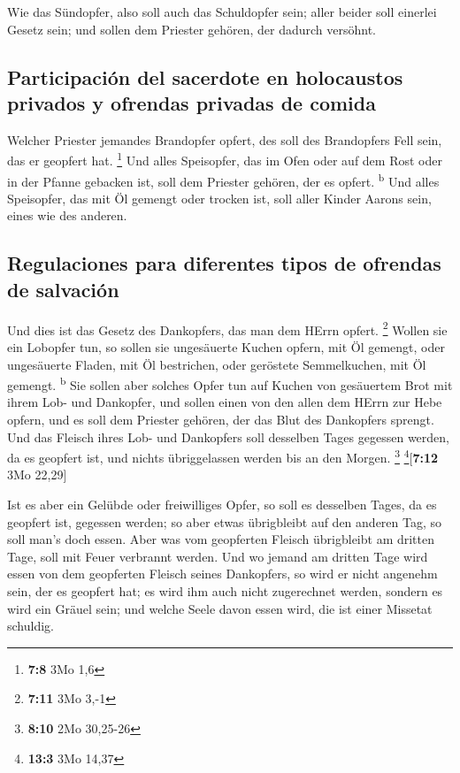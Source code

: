  Wie das Sündopfer, also soll auch das Schuldopfer sein;
aller beider soll einerlei Gesetz sein; und sollen dem Priester gehören,
der dadurch versöhnt.

\hypertarget{participaciuxf3n-del-sacerdote-en-holocaustos-privados-y-ofrendas-privadas-de-comida}{%
\subsection{Participación del sacerdote en holocaustos privados y
ofrendas privadas de
comida}\label{participaciuxf3n-del-sacerdote-en-holocaustos-privados-y-ofrendas-privadas-de-comida}}

 Welcher Priester jemandes Brandopfer opfert, des soll des
Brandopfers Fell sein, das er geopfert hat. \footnote{\textbf{7:8} 3Mo
  1,6}  Und alles Speisopfer, das im Ofen oder auf dem
Rost oder in der Pfanne gebacken ist, soll dem Priester gehören, der es
opfert. \textsuperscript{b}  Und alles Speisopfer, das
mit Öl gemengt oder trocken ist, soll aller Kinder Aarons sein, eines
wie des anderen.

\hypertarget{regulaciones-para-diferentes-tipos-de-ofrendas-de-salvaciuxf3n}{%
\subsection{Regulaciones para diferentes tipos de ofrendas de
salvación}\label{regulaciones-para-diferentes-tipos-de-ofrendas-de-salvaciuxf3n}}

 Und dies ist das Gesetz des Dankopfers, das man dem
HErrn opfert. \footnote{\textbf{7:11} 3Mo 3,-1}  Wollen
sie ein Lobopfer tun, so sollen sie ungesäuerte Kuchen opfern, mit Öl
gemengt, oder ungesäuerte Fladen, mit Öl bestrichen, oder geröstete
Semmelkuchen, mit Öl gemengt. \textsuperscript{b}  Sie
sollen aber solches Opfer tun auf Kuchen von gesäuertem Brot mit ihrem
Lob- und Dankopfer,  und sollen einen von den allen dem
HErrn zur Hebe opfern, und es soll dem Priester gehören, der das Blut
des Dankopfers sprengt.  Und das Fleisch ihres Lob- und
Dankopfers soll desselben Tages gegessen werden, da es geopfert ist, und
nichts übriggelassen werden bis an den Morgen. \footnote{\textbf{8:10}
  2Mo 30,25-26} \footnote{\textbf{13:3} 3Mo 14,37}{[}\textbf{7:12} 3Mo
22,29{]}

 Ist es aber ein Gelübde oder freiwilliges Opfer, so soll
es desselben Tages, da es geopfert ist, gegessen werden; so aber etwas
übrigbleibt auf den anderen Tag, so soll man's doch essen.
 Aber was vom geopferten Fleisch übrigbleibt am dritten
Tage, soll mit Feuer verbrannt werden.  Und wo jemand am
dritten Tage wird essen von dem geopferten Fleisch seines Dankopfers, so
wird er nicht angenehm sein, der es geopfert hat; es wird ihm auch nicht
zugerechnet werden, sondern es wird ein Gräuel sein; und welche Seele
davon essen wird, die ist einer Missetat schuldig.

